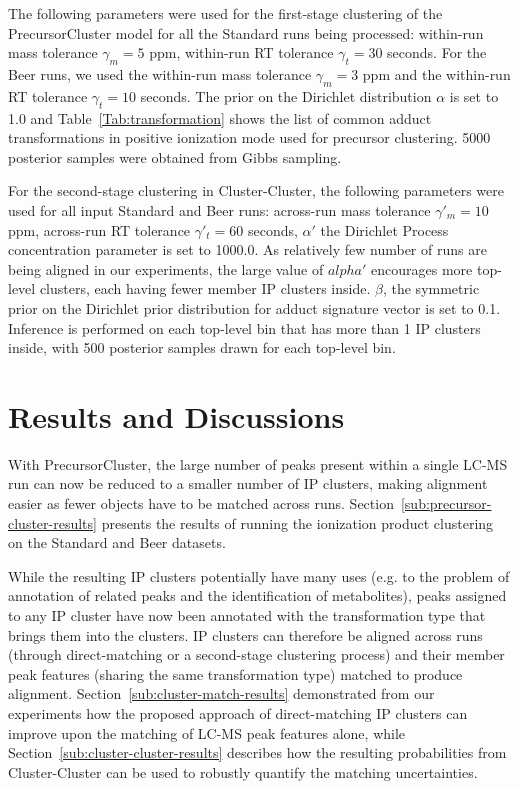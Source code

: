 The following parameters were used for the first-stage clustering of the PrecursorCluster model for all the Standard runs being processed: within-run mass tolerance $\gamma_m=5$ ppm, within-run RT tolerance $\gamma_t=30$ seconds. For the Beer runs, we used the within-run mass tolerance $\gamma_m=3$ ppm and the within-run RT tolerance $\gamma_t=10$ seconds. The prior on the Dirichlet distribution $\alpha$ is set to 1.0 and Table~\ref{Tab:transformation} shows the list of common adduct transformations in positive ionization mode used for precursor clustering. 5000 posterior samples were obtained from Gibbs sampling.

For the second-stage clustering in Cluster-Cluster, the following parameters were used for all input Standard and Beer runs: across-run mass tolerance $\gamma'_m=10$ ppm, across-run RT tolerance $\gamma'_t=60$ seconds, $\alpha'$ the Dirichlet Process concentration parameter is set to 1000.0. As relatively few number of runs are being aligned in our experiments, the large value of $alpha'$ encourages more top-level clusters, each having fewer member IP clusters inside.  $\beta$, the symmetric prior on the Dirichlet prior distribution for adduct signature vector is set to 0.1. Inference is performed on each top-level bin that has more than 1 IP clusters inside, with 500 posterior samples drawn for each top-level bin.

\section{Results and Discussions}

With PrecursorCluster, the large number of peaks present within a single LC-MS run can now be reduced to a smaller number of IP clusters, making alignment easier as fewer objects have to be matched across runs. Section~\ref{sub:precursor-cluster-results} presents the results of running the ionization product clustering on the Standard and Beer datasets. 

While the resulting IP clusters potentially have many uses (e.g. to the problem of annotation of related peaks and the identification of metabolites), peaks assigned to any IP cluster have now been annotated with the transformation type that brings them into the clusters. IP clusters can therefore be aligned across runs (through direct-matching or a second-stage clustering process) and their member peak features (sharing the same transformation type) matched to produce alignment. Section~\ref{sub:cluster-match-results} demonstrated from our experiments how the proposed approach of direct-matching IP clusters can improve upon the matching of LC-MS peak features alone, while Section~\ref{sub:cluster-cluster-results} describes how the resulting probabilities from Cluster-Cluster can be used to robustly quantify the matching uncertainties.

